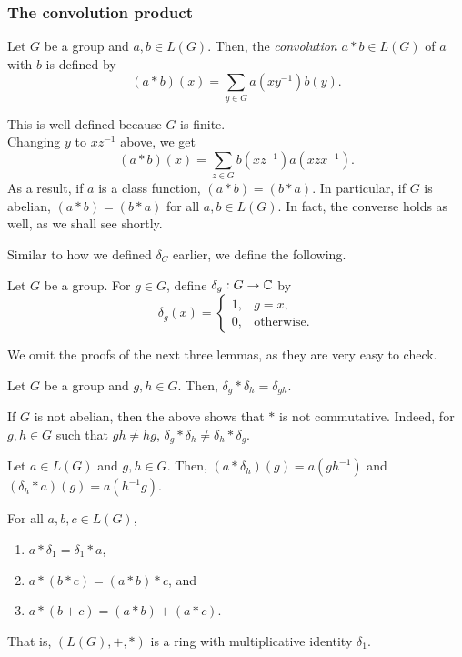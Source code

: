 		\subsubsection{The convolution product}

			\begin{fdef}[Convolution]
				Let $G$ be a group and $a,b \in L(G)$. Then, the \emph{convolution} $a*b \in L(G)$ of $a$ with $b$ is defined by
				\[ (a*b)(x) = \sum_{y \in G} a(xy^{-1}) b(y). \]
			\end{fdef}

			This is well-defined because $G$ is finite.\\

			Changing $y$ to $xz^{-1}$ above, we get
			\[ (a*b)(x) = \sum_{z \in G} b(xz^{-1})a(xzx^{-1}). \]
			As a result, if $a$ is a class function, $(a*b) = (b*a)$. In particular, if $G$ is abelian, $(a*b) = (b*a)$ for all $a,b \in L(G)$. In fact, the converse holds as well, as we shall see shortly.

			Similar to how we defined $\delta_C$ earlier, we define the following.

			\begin{definition}
				Let $G$ be a group. For $g \in G$, define $\delta_g : G \to \mathbb{C}$ by
				\[ \delta_g(x) = \begin{cases} 1, & g = x, \\ 0, & \text{otherwise.} \end{cases} \]
			\end{definition}

			We omit the proofs of the next three lemmas, as they are very easy to check.
			
			\begin{prop}
				Let $G$ be a group and $g,h \in G$. Then, $\delta_g * \delta_h = \delta_{gh}$.
			\end{prop}

			If $G$ is not abelian, then the above shows that $*$ is not commutative. Indeed, for $g,h \in G$ such that $gh \ne hg$, $\delta_g * \delta_h \ne \delta_h * \delta_g$.

			\begin{prop}
				\label{prop: convolution with delta}
				Let $a \in L(G)$ and $g,h \in G$. Then, $(a*\delta_h)(g) = a(gh^{-1})$ and $(\delta_h*a)(g) = a(h^{-1}g)$.
			\end{prop}

			\begin{fprop}
				For all $a,b,c\in L(G)$,
				\begin{enumerate}
					\item $a * \delta_1 = \delta_1 * a$,
					\item $a * (b * c) = (a * b) * c$, and
					\item $a * (b + c) = (a * b) + (a * c)$.
				\end{enumerate}
				That is, $(L(G),+,*)$ is a ring with multiplicative identity $\delta_1$.
			\end{fprop}

